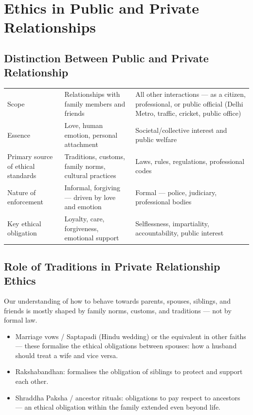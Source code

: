 \section{Ethics in Public and Private Relationships}

\subsection{Distinction Between Public and Private Relationship}

\begin{center}
\begin{tabularx}{\textwidth}{>{\raggedright\arraybackslash}p{2.9cm} Y Y}
 &  &  \\
\toprule
Scope & Relationships with family members and friends & All other interactions --- as a citizen, professional, or public official (Delhi Metro, traffic, cricket, public office) \\
Essence & Love, human emotion, personal attachment & Societal/collective interest and public welfare \\
Primary source of ethical standards & Traditions, customs, family norms, cultural practices & Laws, rules, regulations, professional codes \\
Nature of enforcement & Informal, forgiving --- driven by love and emotion & Formal --- police, judiciary, professional bodies \\
Key ethical obligation & Loyalty, care, forgiveness, emotional support & Selflessness, impartiality, accountability, public interest \\
\bottomrule
\end{tabularx}
\end{center}

\subsection{Role of Traditions in Private Relationship Ethics}

Our understanding of how to behave towards parents, spouses, siblings, and friends is mostly shaped by family norms, customs, and traditions --- not by formal law.

\begin{ExampleBox}
\begin{itemize}
\item Marriage vows / Saptapadi (Hindu wedding) or the equivalent in other faiths --- these formalise the ethical obligations between spouses: how a husband should treat a wife and vice versa.
\item Rakshabandhan: formalises the obligation of siblings to protect and support each other.
\item Shraddha Paksha / ancestor rituals: obligations to pay respect to ancestors --- an ethical obligation within the family extended even beyond life.
\end{itemize}
\end{ExampleBox}

